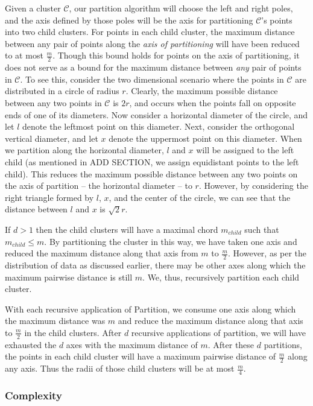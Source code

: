 Given a cluster $\mathcal{C}$, our partition algorithm will choose the left and right poles, 
and the axis defined by those poles will be the axis for partitioning $\mathcal{C}$'s points into two child clusters.
For points in each child cluster, the maximum distance between any pair of points along the \emph{axis of partitioning} will have been reduced to at most $\frac{m}{2}$.
Though this bound holds for points on the axis of partitioning, it does not serve as a bound for the maximum distance between \emph{any} pair of points in $\mathcal{C}$.
To see this, consider the two dimensional scenario where the points in $\mathcal{C}$ are distributed in a circle of radius $r$. Clearly, the maximum possible distance between 
any two points in $\mathcal{C}$ is $2r$, and occurs when the points fall on opposite ends of one of its diameters. Now consider a horizontal diameter of the circle, 
and let $l$ denote the leftmost point on this diameter. Next, consider the orthogonal vertical diameter, and let $x$ denote the uppermost point on this diameter. When we 
partition along the horizontal diameter, $l$ and $x$ will be assigned to the left child (as mentioned in ADD SECTION, we assign equidistant points to the left child). 
This reduces the maximum possible distance between any two points on the axis of partition -- the horizontal diameter -- to $r$. However, by considering the 
right triangle formed by $l$, $x$, and the center of the circle, we can see that the distance between 
$l$ and $x$ is $\sqrt{2}{r}$.


If $d > 1$ then the child clusters will have a maximal chord $m_{child}$ such that $m_{child} \leq m$.
By partitioning the cluster in this way, we have taken one axis and reduced the maximum distance along that axis from $m$ to $\frac{m}{2}$.
However, as per the distribution of data as discussed earlier, there may be other axes along which the maximum pairwise distance is still $m$.
We, thus, recursively partition each child cluster.

With each recursive application of Partition, we consume one axis along which the maximum distance was $m$ and reduce the maximum distance along that axis to $\frac{m}{2}$ in the child clusters.
After $d$ recursive applications of partition, we will have exhausted the $d$ axes with the maximum distance of $m$.
After these $d$ partitions, the points in each child cluster will have a maximum pairwise distance of $\frac{m}{2}$ along any axis.
Thus the radii of those child clusters will be at most $\frac{m}{4}$.

\subsubsection {Complexity}
\label{subsubsec:methods:clustering:complexity}

